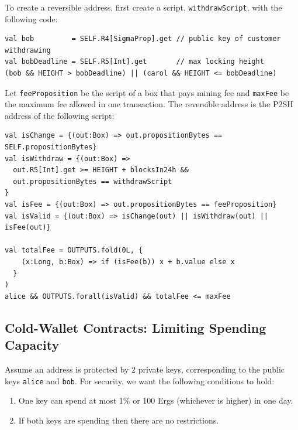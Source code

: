 \documentclass[11pt]{article}
\begin{document}
To create a reversible address, first create a script, \texttt{withdrawScript}, with the following code:
\begin{verbatim}
val bob         = SELF.R4[SigmaProp].get // public key of customer withdrawing
val bobDeadline = SELF.R5[Int].get       // max locking height
(bob && HEIGHT > bobDeadline) || (carol && HEIGHT <= bobDeadline)
\end{verbatim}

Let \texttt{feeProposition} be the script of a box that pays mining fee and \texttt{maxFee} be the maximum fee allowed in one transaction. The reversible address is the P2SH address of the following script:
\begin{verbatim}
val isChange = {(out:Box) => out.propositionBytes == SELF.propositionBytes}
val isWithdraw = {(out:Box) => 
  out.R5[Int].get >= HEIGHT + blocksIn24h && 
  out.propositionBytes == withdrawScript
}
val isFee = {(out:Box) => out.propositionBytes == feeProposition}
val isValid = {(out:Box) => isChange(out) || isWithdraw(out) || isFee(out)}

val totalFee = OUTPUTS.fold(0L, {
    (x:Long, b:Box) => if (isFee(b)) x + b.value else x 
  }
)
alice && OUTPUTS.forall(isValid) && totalFee <= maxFee
\end{verbatim}

\subsection{Cold-Wallet Contracts: Limiting Spending Capacity}

Assume an address is protected by 2 private keys, corresponding to the public keys \texttt{alice} and \texttt{bob}. For security, we want the following conditions to hold:

\begin{enumerate}
	\item One key can spend at most 1\% or 100 Ergs (whichever is higher) in one day.
	\item If both keys are spending then there are no restrictions. 
\end{enumerate}
\end{document}
